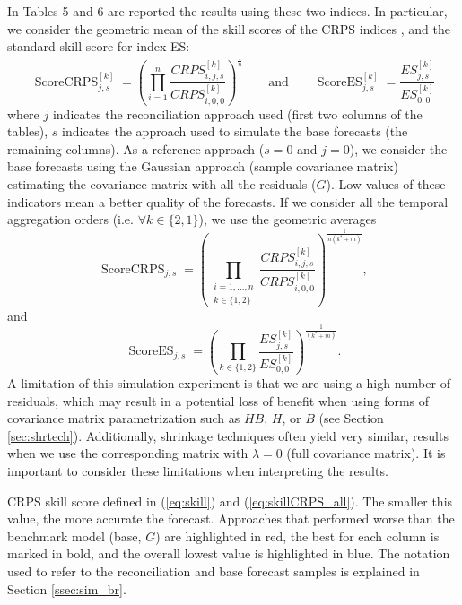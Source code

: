 \documentclass[a4paper,11pt]{article}
\theoremstyle{definition}
\begin{document}
In Tables 5 and 6 are reported the results using these two indices. In 
particular, we consider the geometric mean of the skill scores of the 
CRPS indices \citep{fleming1986}, and the standard skill score 
for index ES:
\begin{equation}\label{eq:skill}
	\operatorname{ScoreCRPS}_{j,s}^{[k]} = \left(\prod_{i = 1}^n \frac{CRPS^{[k]}_{i, j, s}}{CRPS^{[k]}_{i, 0, 0}}\right)^{\frac{1}{n}} \qquad \mathrm{and} \qquad \operatorname{ScoreES}_{j,s}^{[k]} = \frac{ES^{[k]}_{j, s}}{ES^{[k]}_{0, 0}} 
\end{equation}
where $j$ indicates the reconciliation approach used (first two columns of the tables), $s$ indicates the approach used to simulate the base forecasts (the remaining columns). As a reference approach ($s=0$ and $j=0$), we consider the base forecasts using the Gaussian approach (sample covariance matrix) estimating the covariance matrix with all the residuals ($G$). Low values of these indicators mean a better quality of the forecasts. If we consider all the temporal aggregation orders (i.e. $\forall k \in \{2,1\}$), we use the geometric averages
\begin{equation}\label{eq:skillCRPS_all}
	\operatorname{ScoreCRPS}_{j,s} = \left(\prod_{\substack{i = 1, ..., n \\ k \in \{1,2\}}}\frac{CRPS^{[k]}_{i, j, s}}{CRPS^{[k]}_{i, 0, 0}}\right)^{\frac{1}{n(k^\ast+m)}},
\end{equation}
and
\begin{equation}\label{eq:skillES_all}
	\operatorname{ScoreES}_{j,s}= \left(\prod_{k \in \{1,2\}}\frac{ES^{[k]}_{j, s}}{ES^{[k]}_{0, 0}}\right)^{\frac{1}{(k^\ast+m)}}.
\end{equation}
A limitation of this simulation experiment is that we are using a high number of residuals, which may result in a potential loss of benefit when using forms of covariance matrix parametrization such as $HB$, $H$, or $B$ (see Section \ref{sec:shrtech}). Additionally, shrinkage techniques often yield very similar, results when we use the corresponding matrix with $\lambda = 0$ (full covariance matrix). It is important to consider these limitations when interpreting the results. 

\begin{table}[p]
\centering
\begingroup
{}
\fontsize{9}{11}\selectfont

\endgroup
\caption{CRPS skill score defined in (\ref{eq:skill}) and (\ref{eq:skillCRPS_all}). The smaller this value, the more accurate the forecast. Approaches that performed worse than the benchmark model (base, $G$) are highlighted in red, the best for each column is marked in bold, and the overall lowest value is highlighted in blue. The notation used to refer to the reconciliation and base forecast samples is explained in Section \ref{ssec:sim_br}.}
\label{tab:ar2crps}
\end{table}
\end{document}
